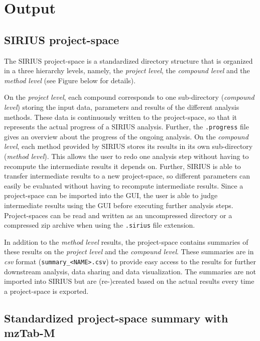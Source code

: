 \documentclass[letterpaper,10pt,openany,oneside]{sphinxmanual}
\begin{document}
\section{Output}
\subsection{SIRIUS project-space}\label{gui:workspace}
The SIRIUS project-space is a standardized directory structure that is
organized in a three hierarchy levels, namely, the \emph{project level}, the
\emph{compound level} and the \emph{method level} (see Figure below for
details).

On the \emph{project level}, each compound corresponds to one sub-directory
(\emph{compound level}) storing
the input data, parameters and results of the different analysis methods.
These data is continuously written to the project-space, so that it represents the actual progress of a SIRIUS analysis. 
Further, the \texttt{.progress} file gives an overview about the progress of the ongoing analysis. 
On the \emph{compound level}, each method provided by SIRIUS stores its results 
in its own sub-directory (\emph{method level}).
This allows the user to redo one analysis step without having to recompute the intermediate results it depends on.
Further, SIRIUS is able to transfer intermediate results to a new project-space, so different parameters can easily be evaluated without
having to recompute intermediate results. 
Since a project-space can be imported into the GUI, the user is able to judge intermediate results using the GUI before executing further analysis steps.
Project-spaces can be read and written as an uncompressed directory or a compressed zip archive when using the \texttt{.sirius} file extension.

In addition to the \emph{method level} results, the project-space contains
summaries of these results on the \emph{project level} and the \emph{compound level}. 
These summaries are in \emph{csv} format (\texttt{summary\_<NAME>.csv}) to provide easy access to the results for further downstream analysis, data sharing and data visualization.
The summaries are not imported 
into SIRIUS but are (re-)created based on the actual results every time a 
project-space is exported.

\subsection{Standardized project-space summary with mzTab-M}
\end{document}
